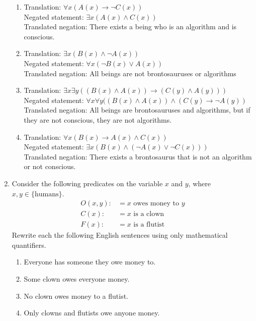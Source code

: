 \begin{enumerate}
    \vspace{2mm}
    \begin{solution}
    \begin{enumerate}
        \item Translation: $\forall x (A(x) \rightarrow \neg C(x))$ \\
        Negated statement: $\exists x (A(x) \land C(x))$ \\
        Translated negation: There exists a being who is an algorithm and is conscious.
        \item Translation: $\exists x (B(x) \land \neg A(x))$ \\
        Negated statement: $\forall x (\neg B(x) \lor A(x))$ \\
        Translated negation: All beings are not brontosauruses or algorithms
        \item Translation: $\exists x \exists y ((B(x) \land A(x)) \rightarrow (C(y) \land A(y)))$ \\
        Negated statement: $\forall x \forall y ((B(x) \land A(x)) \land (C(y) \rightarrow \neg A(y))$ \\
        Translated negation: All beings are brontosauruses and algorithms, but if they are not conscious, they are not algorithms.
        \item Translation: $\forall x (B(x) \rightarrow A(x) \land C(x))$ \\
        Negated statement: $\exists x (B(x) \land (\neg A(x) \lor \neg C(x)))$\\
        Translated negation: There exists a brontosaurus that is not an algorithm or not conscious.
    \end{enumerate}
    \end{solution}
    
    \item Consider the following predicates on the variable $x$ and $y$, where $x,y \in \{\text{humans}\}$.
    \begin{align*}
        O(x,y) :&= \text{$x$ owes money to $y$}\\
        C(x) :&= \text{$x$ is a clown}\\
        F(x) :&= \text{$x$ is a flutist}
    \end{align*}
    Rewrite each the following English sentences using only mathematical quantifiers. 
    \begin{enumerate}
        \item Everyone has someone they owe money to.
        \item Some clown owes everyone money.
        \item No clown owes money to a flutist.
        \item Only clowns and flutists owe anyone money.
    \end{enumerate}


\end{enumerate}
